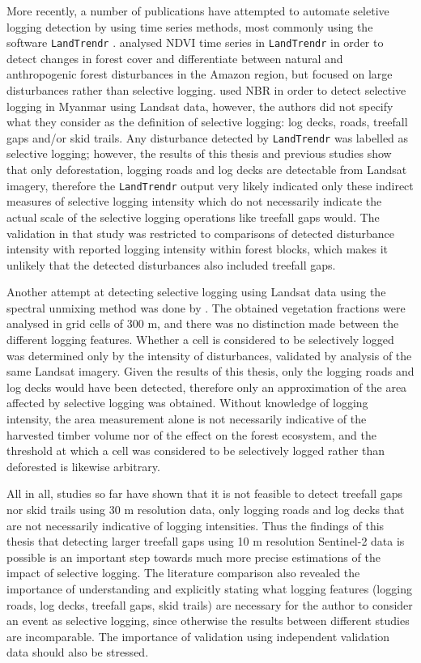 \documentclass[a4paper,12pt]{scrbook}
\begin{document}
More recently, a number of publications have attempted to automate seletive logging detection by using time series methods, most commonly using the software \texttt{LandTrendr} \citep{kennedy_detecting_2010}. \citet{fragal_reconstructing_2016} analysed \ac{NDVI} time series in \texttt{LandTrendr} in order to detect changes in forest cover and differentiate between natural and anthropogenic forest disturbances in the Amazon region, but focused on large disturbances rather than selective logging. \citet{shimizu_using_2017} used \ac{NBR} in order to detect selective logging in Myanmar using Landsat data, however, the authors did not specify what they consider as the definition of selective logging: log decks, roads, treefall gaps and/or skid trails. Any disturbance detected by \texttt{LandTrendr} was labelled as selective logging; however, the results of this thesis and previous studies show that only deforestation, logging roads and log decks are detectable from Landsat imagery, therefore the \texttt{LandTrendr} output very likely indicated only these indirect measures of selective logging intensity which do not necessarily indicate the actual scale of the selective logging operations like treefall gaps would. The validation in that study was restricted to comparisons of detected disturbance intensity with reported logging intensity within forest blocks, which makes it unlikely that the detected disturbances also included treefall gaps.

Another attempt at detecting selective logging using Landsat data using the spectral unmixing method was done by \citet{grecchi_integrated_2017}. The obtained vegetation fractions were analysed in grid cells of 300 m, and there was no distinction made between the different logging features. Whether a cell is considered to be selectively logged was determined only by the intensity of disturbances, validated by analysis of the same Landsat imagery. Given the results of this thesis, only the logging roads and log decks would have been detected, therefore only an approximation of the area affected by selective logging was obtained. Without knowledge of logging intensity, the area measurement alone is not necessarily indicative of the harvested timber volume nor of the effect on the forest ecosystem, and the threshold at which a cell was considered to be selectively logged rather than deforested is likewise arbitrary.

All in all, studies so far have shown that it is not feasible to detect treefall gaps nor skid trails using 30 m resolution data, only logging roads and log decks that are not necessarily indicative of logging intensities. Thus the findings of this thesis that detecting larger treefall gaps using 10 m resolution Sentinel-2 data is possible is an important step towards much more precise estimations of the impact of selective logging. The literature comparison also revealed the importance of understanding and explicitly stating what logging features (logging roads, log decks, treefall gaps, skid trails) are necessary for the author to consider an event as selective logging, since otherwise the results between different studies are incomparable. The importance of validation using independent validation data should also be stressed.
\end{document}

